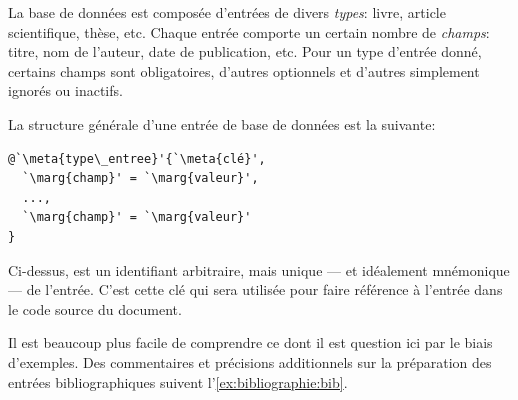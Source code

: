 La base de données est composée d'entrées de divers \emph{types}:
livre, article scientifique, thèse, etc. Chaque entrée comporte un
certain nombre de \emph{champs}: titre, nom de l'auteur, date de
publication, etc. Pour un type d'entrée donné, certains champs sont
obligatoires, d'autres optionnels et d'autres simplement ignorés ou
inactifs.

La structure générale d'une entrée de base de données est la suivante:
\begin{lstlisting}
@`\meta{type\_entree}'{`\meta{clé}',
  `\marg{champ}' = `\marg{valeur}',
  ...,
  `\marg{champ}' = `\marg{valeur}'
}
\end{lstlisting}
Ci-dessus,  est un identifiant arbitraire, mais unique ---
et idéalement mnémonique --- de l'entrée. C'est cette clé qui sera
utilisée pour faire référence à l'entrée dans le code source du
document.

Il est beaucoup plus facile de comprendre ce dont il est question ici
par le biais d'exemples. Des commentaires et précisions additionnels sur la
préparation des entrées bibliographiques suivent l'\autoref*{ex:bibliographie:bib}.

